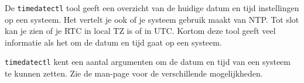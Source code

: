 De \texttt{timedatectl} tool geeft een overzicht van de huidige datum en tijd instellingen op een systeem. Het vertelt je ook of je systeem gebruik maakt van NTP. Tot slot kan je zien of je RTC in local TZ is of in UTC. Kortom deze tool geeft veel informatie als het om de datum en tijd gaat op een systeem.

\texttt{timedatectl} kent een aantal argumenten om de datum en tijd van een systeem te kunnen zetten. Zie de man-page voor de verschillende mogelijkheden.

